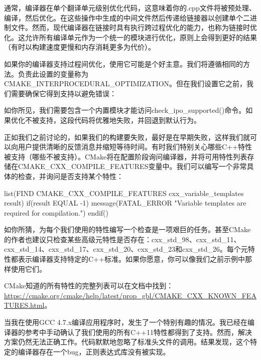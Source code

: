 
通常，编译器在单个翻译单元级别优化代码，这意味着你的.cpp文件将被预处理、编译，然后优化。在这些操作中生成的中间文件然后传递给链接器以创建单个二进制文件。然而，现代编译器在链接时具有执行跨过程优化的能力，也称为链接时优化。这允许所有编译单元作为一个统一的模块进行优化，原则上会得到更好的结果（有时以构建速度更慢和内存消耗更多为代价）。

如果你的编译器支持过程间优化，使用它可能是个好主意。我们将遵循相同的方法。负责此设置的变量称为CMAKE\_INTERPROCEDURAL\_OPTIMIZATION。但在我们设置它之前，我们需要确保它得到支持以避免错误：


如你所见，我们需要包含一个内置模块才能访问check\_ipo\_supported()命令。如果优化不被支持，这段代码将优雅地失败，并回退到默认行为。


正如我们之前讨论的，如果我们的构建要失败，最好是在早期失败，这样我们就可以向用户提供清晰的反馈消息并缩短等待时间。有时我们特别关心哪些C++特性被支持（哪些不被支持）。CMake将在配置阶段询问编译器，并将可用特性列表存储在CMAKE\_CXX\_COMPILE\_FEATURES变量中。我们可以编写一个非常具体的检查，并询问是否支持某个特性：


\begin{cmake}
list(FIND CMAKE_CXX_COMPILE_FEATURES cxx_variable_templates result)
if(result EQUAL -1)
    message(FATAL_ERROR "Variable templates are required for compilation.")
endif()
\end{cmake}

如你所猜，为每个我们使用的特性编写一个检查是一项艰巨的任务。甚至CMake的作者也建议只检查某些高级元特性是否存在：cxx\_std\_98、cxx\_std\_11、cxx\_std\_14、cxx\_std\_17、cxx\_std\_20、cxx\_std\_23和cxx\_std\_26。每个元特性都表示编译器支持特定的C++标准。如果你愿意，你可以像我们之前示例中那样使用它们。

CMake知道的所有特性的完整列表可以在文档中找到：\url{https://cmake.org/cmake/help/latest/prop_gbl/CMAKE_CXX_KNOWN_FEATURES.html}。



当我在使用GCC 4.7.x编译应用程序时，发生了一个特别有趣的情况。我已经在编译器的参考中手动确认了我们使用的所有C++11特性都得到了支持。然而，解决方案仍然无法正确工作。代码默默地忽略了标准头文件的调用。结果发现，这个特定的编译器存在一个bug，正则表达式库没有被实现。


